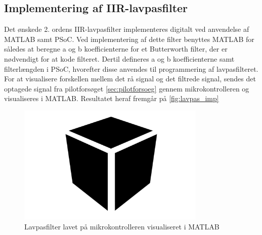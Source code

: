 \subsection{Implementering af IIR-lavpasfilter}
Det ønskede 2. ordens IIR-lavpasfilter implementeres digitalt ved anvendelse af MATLAB samt PSoC.
Ved implementering af dette filter benyttes MATLAB for således at beregne a og b koefficienterne for et Butterworth filter, der er nødvendigt for at kode filteret. Dertil defineres a og b koefficienterne samt filterlængden i PSoC, hvorefter disse anvendes til programmering af lavpasfilteret. 
For at visualisere forskellen mellem det rå signal og det filtrede signal, sendes det optagede signal fra pilotforsøget \autoref{sec:pilotforsoeg} gennem mikrokontrolleren og visualiseres i MATLAB. Resultatet heraf fremgår på \autoref{fig:lavpas_imp}

\begin{figure}[H]
\centering
\includegraphics[width=0.8\textwidth]{figures/Pilotforsoeg/blackbox}
\caption{Lavpasfilter lavet på mikrokontrolleren visualiseret i MATLAB}
\label{fig:lavpas_imp}
\end{figure}
 
